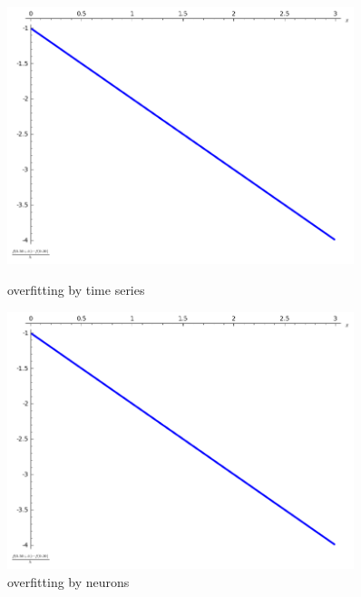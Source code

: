 \documentclass[a4paper]{article}
\begin{document}
\begin{figure}[!ht]
    \centering
    \begin{minipage}{0.45\textwidth}
        \centering
        \includegraphics[width=0.9\textwidth]{illustration1.png} %
        \caption{overfitting by  time series}
    \end{minipage}\hfill
    \begin{minipage}{0.45\textwidth}
        \centering
        \includegraphics[width=0.9\textwidth]{illustration1.png} %
        \caption{overfitting by  neurons}
    \end{minipage}
\end{figure}





\end{document}

